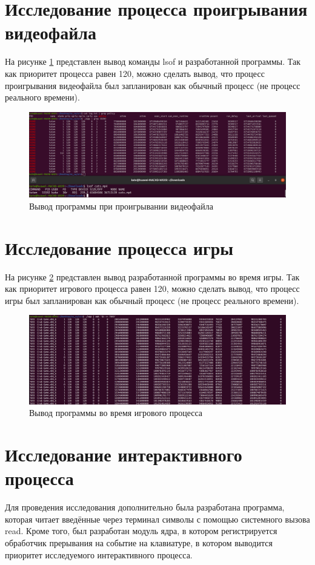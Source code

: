 \section{Исследование процесса проигрывания видеофайла}

На рисунке \ref{video} представлен вывод команды lsof и разработанной программы. Так как приоритет процесса равен 120, можно сделать вывод, что процесс проигрывания видеофайла был запланирован как обычный процесс (не процесс реального времени).

\begin{figure}[H]
	\centering
	\includegraphics[width=\linewidth]{img/video.png}
	\caption{Вывод программы при проигрывании видеофайла}
	\label{video}
\end{figure}
\newpage
\section{Исследование процесса игры}

На рисунке \ref{game} представлен вывод разработанной программы во время игры. Так как приоритет игрового процесса равен 120, можно сделать вывод, что процесс игры был запланирован как обычный процесс (не процесс реального времени).

\begin{figure}[H]
	\centering
	\includegraphics[width=\linewidth]{img/game.png}
	\caption{Вывод программы во время игрового процесса}
	\label{game}
\end{figure}

\section{Исследование интерактивного процесса}
Для проведения исследования дополнительно была разработана программа, которая читает введённые через терминал символы с помощью системного вызова read. Кроме того, был разработан модуль ядра, в котором регистрируется обработчик прерывания на событие на клавиатуре, в котором выводится приоритет исследуемого интерактивного процесса.


